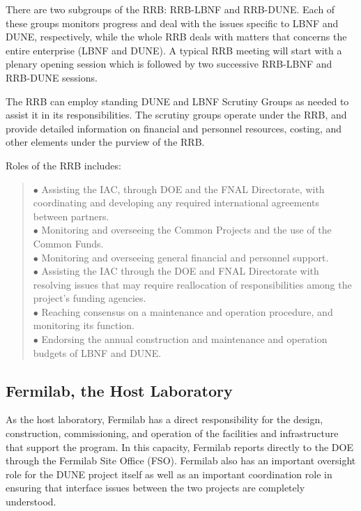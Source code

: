 There are two subgroups of the RRB: RRB-LBNF and RRB-DUNE. Each of
these groups monitors progress and deal with the issues specific to
LBNF and DUNE, respectively, while the whole RRB deals with matters
that concerns the entire enterprise (LBNF and DUNE). A typical RRB meeting
will start with a plenary opening session which is followed by two
successive RRB-LBNF and RRB-DUNE sessions.

The RRB can employ standing DUNE and LBNF Scrutiny Groups as needed
to assist it in its responsibilities. The scrutiny groups operate
under the RRB, and provide detailed information on financial and
personnel resources, costing, and other elements under the purview of the RRB.

Roles of the RRB includes:

\begin{quote}
$\bullet$ Assisting the IAC, through DOE and the FNAL Directorate,
with coordinating and developing any required international
agreements between partners.\\
$\bullet$ Monitoring and overseeing the Common Projects and the
use of the Common Funds.\\
$\bullet$ Monitoring and overseeing general financial and personnel support.\\
$\bullet$ Assisting the IAC through the DOE and FNAL Directorate
with resolving issues that may require reallocation of responsibilities
among the project’s funding agencies.\\
$\bullet$ Reaching consensus on a maintenance and operation procedure,
and monitoring its function.\\
$\bullet$ Endorsing the annual construction and maintenance and operation
budgets of LBNF and DUNE.\\
\end{quote}

\subsection{Fermilab, the Host Laboratory}

As the host laboratory, Fermilab has a direct responsibility for the design,
construction, commissioning, and operation of the facilities and
infrastructure that support the program.  In this capacity, Fermilab reports
directly to the DOE through the Fermilab Site Office (FSO).
Fermilab also has an important oversight role for the DUNE project
itself as well as an important coordination role in ensuring that
interface issues between the two projects are completely understood.

